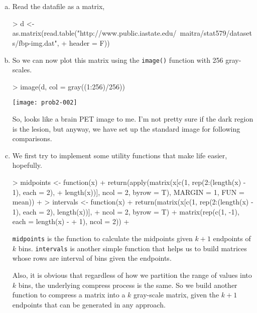 
\section{}
\begin{enumerate}[(a)]
    \item
    Read the datafile as a matrix,
\begin{Schunk}
\begin{Sinput}
> d <- as.matrix(read.table("http://www.public.iastate.edu/~maitra/stat579/datasets/fbp-img.dat", 
+     header = F))
\end{Sinput}
\end{Schunk}
    \item So we can now plot this matrix using the \verb=image()= function with 256 gray-scales.
\begin{Schunk}
\begin{Sinput}
> image(d, col = gray((1:256)/256))
\end{Sinput}
\end{Schunk}
\texttt{[image: prob2-002]}

    So, looks like a brain PET image to me. I'm not pretty sure if the dark region is the lesion, but anyway, we have set up the standard image for following comparisons.
    \item
    We first try to implement some utility functions that make life easier, hopefully.
\begin{Schunk}
\begin{Sinput}
> midpoints <- function(x) {
+     return(apply(matrix(x[c(1, rep(2:(length(x) - 1), each = 2), 
+         length(x))], ncol = 2, byrow = T), MARGIN = 1, FUN = mean))
+ }
> intervals <- function(x) {
+     return(matrix(x[c(1, rep(2:(length(x) - 1), each = 2), length(x))], 
+         ncol = 2, byrow = T) + matrix(rep(c(1, -1), each = length(x) - 
+         1), ncol = 2))
+ }
\end{Sinput}
\end{Schunk}
    \verb=midpoints= is the function to calculate the midpoints given $k+1$ endpoints of $k$ bins. \verb=intervals= is another simple function that helps us to build matrices whose rows are interval of bins given the endpoints. 

    Also, it is obvious that regardless of how we partition the range of values into $k$ bins, the underlying compress process is the same. So we build another function to compress a matrix into a $k$ gray-scale matrix, given the $k+1$ endpoints that can be generated in any approach.


\end{enumerate}

